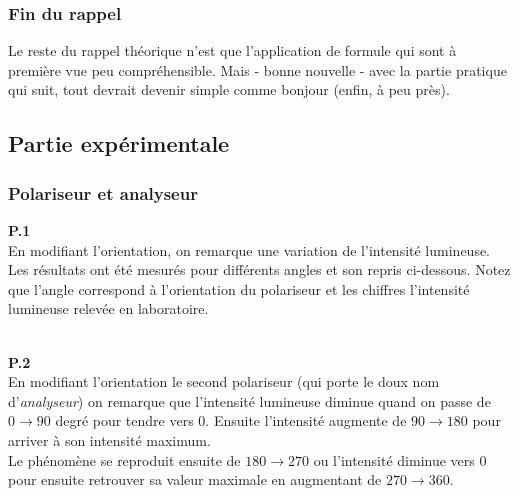 \documentclass	[11pt, a4paper, openany]{book}
\begin{document}
		\subsubsection*{Fin du rappel}
		Le reste du rappel théorique n'est que l'application de formule qui sont à première vue peu compréhensible. Mais - bonne nouvelle - avec la partie pratique qui suit, tout devrait devenir simple comme bonjour (enfin, à peu près).
		
		\subsection{Partie expérimentale}
		\subsubsection*{Polariseur et analyseur}
		\textbf{P.1}\\
		En modifiant l'orientation, on remarque une variation de l'intensité lumineuse. Les résultats ont été mesurés pour différents angles et son repris ci-dessous. Notez que l'angle correspond à l'orientation du polariseur et les chiffres l'intensité lumineuse relevée en laboratoire.
		\begin{center}
		\end{center}
		\ \\
		\textbf{P.2}\\
		En modifiant l'orientation le second polariseur (qui porte le doux nom d'\textit{analyseur}) on remarque que l'intensité lumineuse diminue quand on passe de $0 \rightarrow 90$ degré pour tendre vers 0. Ensuite l'intensité augmente de $90 \rightarrow 180$ pour arriver à son intensité maximum.\\
		Le phénomène se reproduit ensuite de $180 \rightarrow 270$ ou l'intensité diminue vers 0 pour ensuite retrouver sa valeur maximale en augmentant de $270 \rightarrow 360$.\\
		
\end{document}
